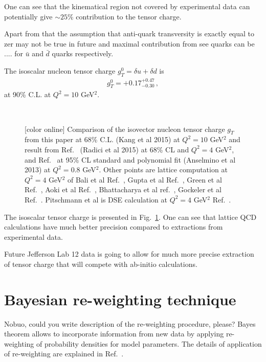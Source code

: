 \documentclass[twocolumn,showpacs,preprintnumbers,amsmath,amssymb,floatfix,prd]{revtex4}
\newcommand*{\FigPath}{.}%
\def\AP#1{{\color{blue} #1}}
\begin{document}
One can see that the kinematical region not covered by experimental data can potentially give $\sim 25$\% contribution to the tensor charge.

Apart from that the assumption that anti-quark transversity is exactly equal to zer may not be true in future and maximal contribution from see quarks can be ....
for $\bar u$ and $\bar d$ quarks respectively.


The isoscalar nucleon tensor charge $g_T^0= \delta u + \delta d$ is
\begin{eqnarray}
g_T^0 = +0.17^{+0.47}_{-0.30} \, ,
\end{eqnarray}
at 90\% C.L. at  $Q^2=10$ GeV$^2$.



\begin{figure}[tbp]
\centering
 \\
\caption{[color online] Comparison of the isovector nucleon tensor charge $g_T$   from this paper at 68\% C.L. (Kang et al 2015) at $Q^2=10$ GeV$^2$ and result from Ref.~\cite{Radici:2015mwa}  (Radici et al 2015) at 68\% CL and  $Q^2=4$ GeV$^2$,
and Ref.~\cite{Anselmino:2013vqa} at 95\% CL standard and polynomial fit (Anselmino et al 2013) at $Q^2=0.8$ GeV$^2$. Other points are lattice computation  at $Q^2=4$ GeV$^2$ of Bali et al Ref.~\cite{Bali:2014nma},  Gupta et al Ref.~\cite{Gupta:2015tpa}, Green et al Ref.~\cite{Green:2012ej}, Aoki et al Ref.~\cite{Aoki:2010xg}, Bhattacharya et al  ref.~\cite{Bhattacharya:2013ehc}, Gockeler et al Ref.~\cite{Gockeler:2005cj}. Pitschmann et al is DSE calculation at $Q^2=4$ GeV$^2$  Ref.~\cite{Pitschmann:2014jxa}.}
\label{fig:comparison_gt}
\end{figure}
  
The isoscalar tensor charge is presented in Fig.~\ref{fig:comparison_gt}. 
One can see that lattice QCD calculations have much better precision compared to extractions from experimental data.

Future Jefferson Lab 12 data is going to allow for much more precise extraction of tensor charge that will compete with ab-initio calculations.

\section{Bayesian re-weighting technique}
%
\AP{Nobuo, could you write description of the re-weighting procedure, please?}
Bayes theorem allows to incorporate information from new data by applying re-weighting of probability densities for model parameters. The details of application of re-weighting are explained in Ref.~\cite{Sato:2013ika}.
\end{document}
